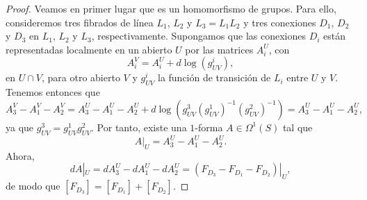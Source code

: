 \documentclass[12pt,a4paper]{article}
\theoremstyle{definition} \newtheorem{defn}[thm]{Definición}
\theoremstyle{definition} \newtheorem{ejemplo}[thm]{Ejemplo}
\theoremstyle{definition} \newtheorem{ejercicio}[thm]{Ejercicio}
\begin{document}
\begin{proof}
  Veamos en primer lugar que es un homomorfismo de grupos. Para ello, consideremos tres fibrados de línea $L_1$, $L_2$ y $L_3=L_1L_2$ y tres conexiones $D_1$, $D_2$ y $D_3$ en $L_1$, $L_2$ y $L_3$, respectivamente. Supongamos que las conexiones $D_i$ están representadas localmente en un abierto $U$ por las matrices $A_i^U$, con
  \begin{equation*}
    A_i^V = A_i^U + d\log(g^i_{UV}),
  \end{equation*}
  en $U\cap V$, para otro abierto $V$ y $g^i_{UV}$ la función de transición de $L_i$ entre $U$ y $V$. Tenemos entonces que
  \begin{equation*}
    A_3^V - A_1^V - A_2^V = A_3^U - A_1^U - A_2^U + d\log(g^3_{UV}(g^1_{UV})^{-1} (g^2_{UV})^{-1}) = A_3^U - A_1^U - A_2^U,
  \end{equation*}
  ya que $g^3_{UV} = g^1_{UV} g^2_{UV}$. Por tanto, existe una $1$-forma $A \in \Omega^1(S)$ tal que $$A|_U = A_3^U - A_1^U - A_2^U.$$
  Ahora, 
  \begin{equation*}
    dA |_U = dA_3^U - dA_1^U - dA_2^U = (F_{D_3} - F_{D_1} - F_{D_2})|_U,
  \end{equation*}
  de modo que $[F_{D_3}]=[F_{D_1}] + [F_{D_2}]$.


\end{proof}
\end{document}
